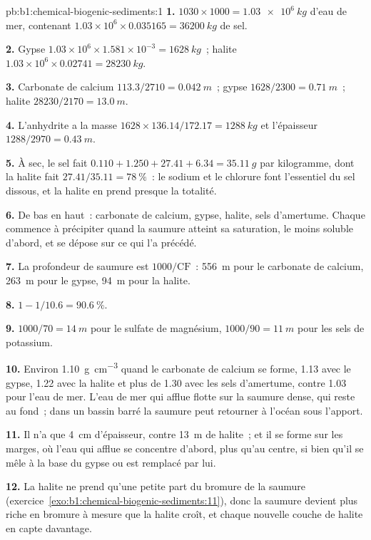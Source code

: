 \begin{solution}{pb:b1:chemical-biogenic-sediments:1}
\textbf{1.} $1030\times1000 = \qty{1.03e6}{kg}$ d'eau de mer, contenant
$1.03\times10^6\times0.035165 = \qty{36200}{kg}$ de sel.

\textbf{2.} Gypse $1.03\times10^6\times1.581\times10^{-3} = \qty{1628}{kg}$~;
halite $1.03\times10^6\times0.02741 = \qty{28230}{kg}$.

\textbf{3.} Carbonate de calcium $113.3/2710 = \qty{0.042}{m}$~; gypse $1628/2300 =
\qty{0.71}{m}$~; halite $28230/2170 = \qty{13.0}{m}$.

\textbf{4.} L'anhydrite a la masse $1628\times136.14/172.17 =
\qty{1288}{kg}$ et l'épaisseur $1288/2970 = \qty{0.43}{m}$.

\textbf{5.} À sec, le sel fait $0.110 + 1.250 + 27.41 + 6.34 = \qty{35.11}{g}$ par
kilogramme, dont la halite fait $27.41/35.11 = \qty{78}{\%}$~: le sodium et le chlorure
font l'essentiel du sel dissous, et la halite en prend presque la totalité.

\textbf{6.} De bas en haut~: carbonate de calcium, gypse, halite, sels
d'amertume. Chaque  commence à précipiter quand la saumure atteint sa
saturation, le moins soluble d'abord, et se dépose sur ce qui l'a précédé.

\textbf{7.} La profondeur de saumure est $1000/\mathrm{CF}$~: \qty{556}{m} pour le carbonate de
calcium, \qty{263}{m} pour le gypse, \qty{94}{m} pour la halite.

\textbf{8.} $1 - 1/10.6 = \qty{90.6}{\%}$.

\textbf{9.} $1000/70 = \qty{14}{m}$ pour le sulfate de magnésium, $1000/90 = \qty{11}{m}$
pour les sels de potassium.

\textbf{10.} Environ \qty{1.10}{g.cm^{-3}} quand le carbonate de calcium se forme, 1.13 avec
le gypse, 1.22 avec la halite et plus de 1.30 avec les sels d'amertume, contre 1.03 pour
l'eau de mer. L'eau de mer qui afflue flotte sur la saumure dense, qui reste au
fond~; dans un bassin barré la saumure peut retourner à l'océan sous
l'apport.

\textbf{11.} Il n'a que \qty{4}{cm} d'épaisseur, contre \qty{13}{m} de halite~; et il
se forme sur les marges, où l'eau qui afflue se concentre d'abord, plus qu'au
centre, si bien qu'il se mêle à la base du gypse ou est remplacé par lui.

\textbf{12.} La halite ne prend qu'une petite part du bromure de la saumure
(exercice~\ref{exo:b1:chemical-biogenic-sediments:11}), donc la saumure devient
plus riche en bromure à mesure que la halite croît, et chaque nouvelle couche de halite en capte
davantage.


\end{solution}
